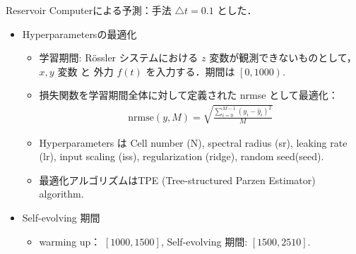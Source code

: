 \begin{frame}{Reservoir Computerによる予測：手法}
    $\triangle t = 0.1$ とした．
    \begin{itemize}
        \item Hyperparametersの最適化
        \begin{itemize}
            \item 学習期間: Rössler システムにおける $z$ 変数が観測できないものとして， $x, y$ 変数 と 外力 $f(t)$ を入力する．期間は $\left.\left[ 0, 1000 \right.\right).$ \vspace{.2em}
            \item 損失関数を学習期間全体に対して定義された nrmse として最適化：
            \vspace{.2em}
            \begin{align}
                \text{nrmse}(y, M) = \sqrt{\frac{\sum_{i=0}^{M-1}\left(y_i-\hat{y}_i\right)^2}{M}}
            \end{align}
            \item Hyperparameters は Cell number (N), spectral radius (sr), leaking rate (lr), input scaling (iss), regularization (ridge), random seed(seed). \vspace{.2em}
            \item 最適化アルゴリズムはTPE (Tree-structured Parzen Estimator) algorithm.
        \end{itemize}
        \item Self-evolving 期間
        \begin{itemize}
            \item warming up：
            $\left.\left[ 1000,  1500\right.\right]$, Self-evolving 期間: $\left[ 1500,  2510\right].$
        \end{itemize}
    \end{itemize}
\end{frame}


